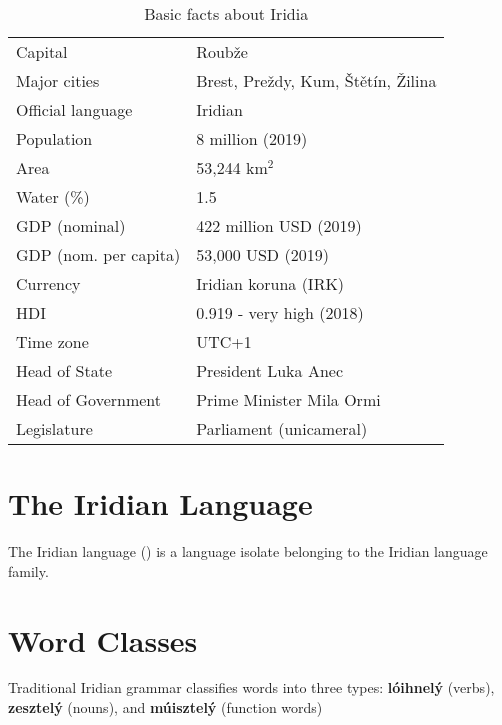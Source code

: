 \begin{table}
\centering \begin{tabular}{ll} \hline
Capital & Roubže \\
Major cities & Brest, Preždy, Kum, Štětín, Žilina \\
Official language & Iridian \\
Population & 8 million (2019) \\
Area & 53,244 km$^2$ \\
Water (\%) & 1.5 \\
GDP (nominal) & 422 million USD (2019) \\
GDP (nom. per capita) & 53,000 USD (2019) \\
Currency & Iridian koruna (IRK) \\
HDI & 0.919 - very high (2018) \\
Time zone & UTC+1 \\
Head of State & President Luka Anec \\
Head of Government & Prime Minister Mila Ormi \\
Legislature & Parliament (unicameral)\\
\hline
\end{tabular}
\caption{Basic facts about Iridia}
\label{tab:fact-sheet}
\end{table}


\section{The Iridian Language}

The Iridian language () is a language isolate belonging to the Iridian language family. 


\section{Word Classes}\label{sec:wordclasses}
Traditional Iridian grammar classifies words into three types: \textbf{lóihnelý} (verbs), \textbf{zesztelý} (nouns), and \textbf{múisztelý} (function words)
